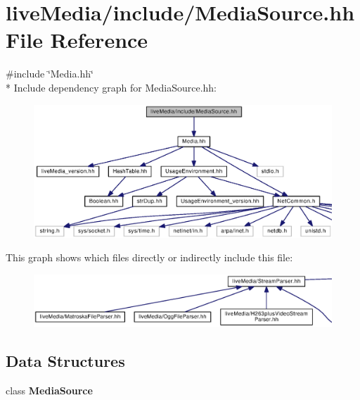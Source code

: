 \section{live\+Media/include/\+Media\+Source.hh File Reference}
\label{MediaSource_8hh}
{\ttfamily \#include \char`\"{}Media.\+hh\char`\"{}}\\*
Include dependency graph for Media\+Source.\+hh\+:
\nopagebreak
\begin{figure}[H]
\begin{center}
\leavevmode
\includegraphics[width=350pt]{MediaSource_8hh__incl}
\end{center}
\end{figure}
This graph shows which files directly or indirectly include this file\+:
\nopagebreak
\begin{figure}[H]
\begin{center}
\leavevmode
\includegraphics[width=350pt]{MediaSource_8hh__dep__incl}
\end{center}
\end{figure}
\subsection*{Data Structures}
\begin{DoxyCompactItemize}
\item 
class {\bf Media\+Source}
\end{DoxyCompactItemize}
